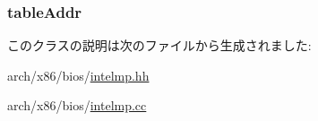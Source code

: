 \label{classX86ISA_1_1IntelMP_1_1FloatingPointer_a56f76c52b1f369ed1502d8ed9d6e4027}
\hypertarget{classX86ISA_1_1IntelMP_1_1FloatingPointer_a16ed5ed4b0f43ba258ed54dc46bf9c49}{
\subsubsection[{tableAddr}]{ {\bf tableAddr}}}
\label{classX86ISA_1_1IntelMP_1_1FloatingPointer_a16ed5ed4b0f43ba258ed54dc46bf9c49}


このクラスの説明は次のファイルから生成されました:\begin{DoxyCompactItemize}
\item 
arch/x86/bios/\hyperlink{intelmp_8hh}{intelmp.hh}\item 
arch/x86/bios/\hyperlink{intelmp_8cc}{intelmp.cc}\end{DoxyCompactItemize}
